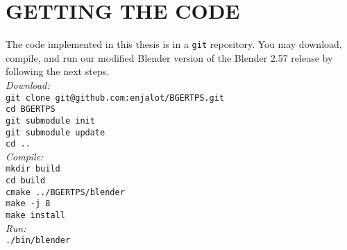 \chapter{GETTING THE CODE}

The code implemented in this thesis is in a \texttt{git} repository. You may download, compile, and run our modified Blender version of the Blender 2.57 release by following the next steps. \\

\noindent
\textit{Download:} \\
\texttt{git clone git@github.com:enjalot/BGERTPS.git} \\
\texttt{cd BGERTPS} \\
\texttt{git submodule init} \\
\texttt{git submodule update} \\
\texttt{cd ..} \\

\noindent
\textit{Compile:} \\
\texttt{mkdir build} \\
\texttt{cd build} \\
\texttt{cmake ../BGERTPS/blender} \\
\texttt{make -j 8} \\
\texttt{make install} \\

\noindent
\textit{Run:} \\
\texttt{./bin/blender} \\


